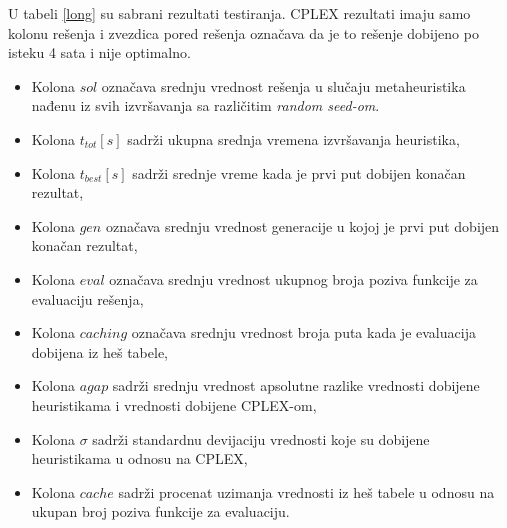 \documentclass[a4paper]{article}
\begin{document}
U tabeli \ref{long} su sabrani rezultati testiranja. CPLEX rezultati imaju samo kolonu rešenja i zvezdica pored rešenja označava da je to rešenje dobijeno po isteku 4 sata i nije optimalno. 
\begin{itemize}
\item
Kolona $sol$ označava srednju vrednost rešenja u slučaju metaheuristika nađenu iz svih izvršavanja sa različitim \emph{random seed-om}. 
\item Kolona $t_{tot}[s]$ sadrži ukupna srednja vremena izvršavanja heuristika,
\item Kolona $t_{best}[s]$ sadrži srednje vreme kada je prvi put dobijen konačan rezultat,
\item Kolona $gen$ označava srednju vrednost generacije u kojoj je prvi put dobijen konačan rezultat,
\item Kolona $eval$ označava srednju vrednost ukupnog broja poziva funkcije za evaluaciju rešenja,
\item Kolona $caching$ označava srednju vrednost broja puta kada je evaluacija dobijena iz heš tabele,
\item Kolona $agap$ sadrži srednju vrednost apsolutne razlike vrednosti dobijene heuristikama i vrednosti dobijene CPLEX-om,
\item Kolona $\sigma$ sadrži standardnu devijaciju vrednosti koje su dobijene heuristikama u odnosu na CPLEX,
\item Kolona $cache$ sadrži procenat uzimanja vrednosti iz heš tabele u odnosu na ukupan broj poziva funkcije za evaluaciju.
\end{itemize}
\end{document}
